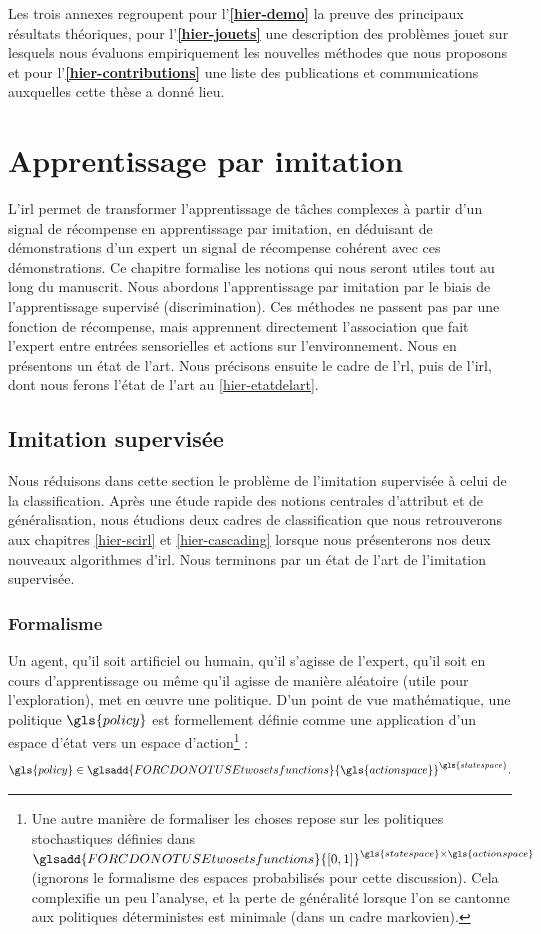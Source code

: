 \documentclass[frenchb,a4paper,justified,notoc]{tufte-book}
\newcommand{\statespace}{\gls{statespace}}
\newcommand{\actionspace}{\gls{actionspace}}
\newcommand{\policy}{\gls{policy}}
\newcommand{\twosetsfunctions}[2]{\ensuremath{\glsadd{FORCDONOTUSEtwosetsfunctions}{#2}^{#1}}}
\begin{document}
Les trois annexes regroupent pour l'\textbf{\autoref{hier-demo}} la preuve des principaux résultats théoriques, pour l'\textbf{\autoref{hier-jouets}} une description des problèmes jouet sur lesquels nous évaluons empiriquement les nouvelles méthodes que nous proposons et pour l'\textbf{\autoref{hier-contributions}} une liste des publications et communications auxquelles cette thèse a donné lieu.
\chapter{Apprentissage par imitation}
\label{sec-2}
\label{hier-formalisme}

  L'\gls{irl} permet de transformer l'apprentissage de tâches complexes à partir d'un signal de récompense en apprentissage par imitation, en déduisant de démonstrations d'un expert un signal de récompense cohérent avec ces démonstrations. Ce chapitre formalise les notions qui nous seront utiles tout au long du manuscrit. Nous abordons l'apprentissage par imitation par le biais de l'apprentissage supervisé (discrimination). Ces méthodes ne passent pas par une fonction de récompense, mais apprennent directement l'association que fait l'expert entre entrées sensorielles et actions sur l'environnement. Nous en présentons un état de l'art. Nous précisons ensuite le cadre de l'\gls{rl}, puis de l'\gls{irl}, dont nous ferons l'état de l'art au \autoref{hier-etatdelart}.
\section{Imitation supervisée}
\label{sec-2-1}
\label{hier-nonari}

Nous réduisons dans cette section le problème de l'imitation supervisée à celui de la classification. Après une étude rapide des notions centrales d'attribut et de généralisation, nous étudions deux cadres de classification que nous retrouverons aux chapitres \ref{hier-scirl} et \ref{hier-cascading} lorsque nous présenterons nos deux nouveaux algorithmes d'\gls{irl}. Nous terminons par un état de l'art de l'imitation supervisée.
\subsection{Formalisme}
\label{sec-2-1-1}

   Un agent, qu'il soit artificiel ou humain, qu'il s'agisse de l'expert, qu'il soit en cours d'apprentissage ou même qu'il agisse de manière aléatoire (utile pour l'exploration), met en œuvre une politique. D'un point de vue mathématique, une politique $\policy$ est formellement définie comme une application d'un espace d'état vers un espace d'action\footnote{Une autre manière de formaliser les choses repose sur les politiques stochastiques définies dans $\twosetsfunctions{\statespace\times\actionspace}{[0,1]}$ (ignorons le formalisme des espaces probabilisés pour cette discussion). Cela complexifie un peu l'analyse, et la perte de généralité lorsque l'on se cantonne aux politiques déterministes est minimale (dans un cadre markovien).
 } :
\begin{equation}
\policy \in \twosetsfunctions{\statespace}{\actionspace}.
\end{equation}
  
\end{document}
